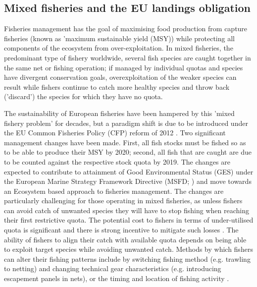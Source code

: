 \documentclass{nature}
\begin{document}
\begin{linenumbers}
\begin{abstract}
[263 words]

\end{abstract}

\section*{}

\subsection{Mixed fisheries and the EU landings obligation} 

Fisheries management has the goal of maximising food production from capture
fisheries (known as 'maximum sustainable yield (MSY)) while protecting all
components of the ecosystem from over-exploitation. In mixed fisheries, the
predominant type of fishery worldwide, several fish species are caught together
in the same net or fishing operation; if managed by individual quotas and
species have divergent conservation goals, overexploitation of the
weaker species can result while fishers continue to catch more healthy species
and throw back ('discard') the species for which they have no quota.

The sustainability of European fisheries have been hampered by this 'mixed
fishery problem' for decades, but a paradigm shift is due to be introduced
under the EU Common Fisheries Policy (CFP) reform of 2012
\cite{EuropeanParliamentandCounciloftheEuropeanUnion2013}. Two significant
management changes have been made. First, all fish stocks must be fished so as
to be able to produce their MSY by 2020; second, all fish that are caught are
due to be counted against the respective stock quota by 2019. The changes are
expected to contribute to attainment of Good Environmental Status (GES) under
the European Marine Strategy Framework Directive (MSFD;
\cite{EuropeanParliament2008}) and move towards an Ecosystem based approach to
fisheries management. The changes are particularly challenging for those
operating in mixed fisheries, as unless fishers can avoid catch of unwanted
species they will have to stop fishing when reaching their first restrictive
quota. The potential cost to fishers in terms of under-utilised quota is
significant \cite{Hoff2010a, Ulrich2016} and there is strong incentive to
mitigate such losses \cite{Condie2013, Condie2013a}. The ability of fishers to
align their catch with available quota depends on being able to exploit target
species while avoiding unwanted catch. Methods by which fishers can alter their
fishing patterns include by switching fishing method (e.g. trawling to netting)
and changing technical gear characteristics (e.g. introducing escapement panels
in nets), or the timing and location of fishing activity \cite{Fulton2011b,
	vanPutten2012a}.


\end{linenumbers}
\end{document}
